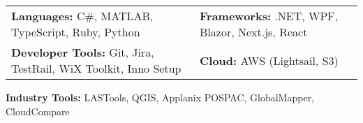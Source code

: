 
\begin{tabular}{p{10.5cm}p{8cm}}
    {\textbf{Languages:} C\#, MATLAB, TypeScript, Ruby, Python} & {\textbf{Frameworks:} .NET, WPF, Blazor, Next.js, React} \\
    {\textbf{Developer Tools:} Git, Jira, TestRail, WiX Toolkit, Inno Setup} & \textbf{Cloud:} AWS (Lightsail, S3) \\
\end{tabular}
\textbf{Industry Tools:} LASTools, QGIS, Applanix POSPAC, GlobalMapper, CloudCompare